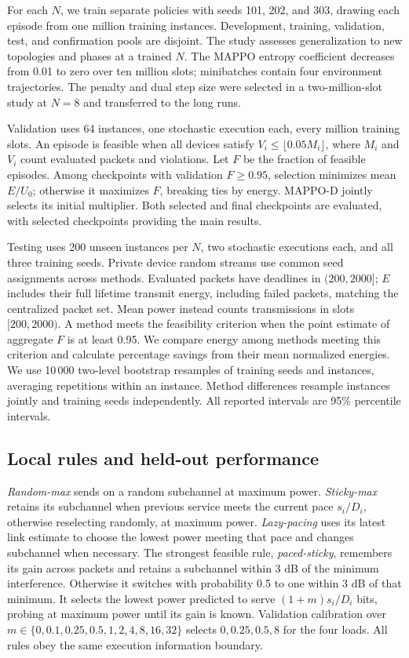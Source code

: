 For each $N$, we train separate policies with seeds 101, 202, and 303,
drawing each episode from one million training instances. Development,
training, validation, test, and confirmation pools are disjoint.
The study assesses generalization to new topologies and phases at a trained
$N$. The MAPPO entropy coefficient decreases from 0.01 to zero over ten
million slots; minibatches contain four environment trajectories.
The penalty and dual step size were selected in a two-million-slot study
at $N=8$ and transferred to the long runs.

Validation uses 64 instances, one stochastic execution each, every million
training slots. An episode is feasible when all devices satisfy
$V_i\le\lfloor0.05M_i\rfloor$, where $M_i$ and $V_i$ count evaluated
packets and violations. Let $F$ be the fraction of feasible episodes.
Among checkpoints with validation $F\ge0.95$, selection minimizes mean
$E/U_0$; otherwise it maximizes $F$, breaking ties by energy.
MAPPO-D jointly selects its initial multiplier. Both selected and final
checkpoints are evaluated, with selected checkpoints providing the main results.

Testing uses 200 unseen instances per $N$, two stochastic executions each,
and all three training seeds. Private device random streams use common seed
assignments across methods. Evaluated packets have deadlines in $(200,2000]$;
$E$ includes their full lifetime transmit energy, including failed packets,
matching the centralized packet set. Mean power instead counts transmissions
in slots $[200,2000)$. A method meets the feasibility criterion when the
point estimate of aggregate $F$ is at least 0.95. We compare energy among
methods meeting this criterion and calculate percentage savings from their
mean normalized energies. We use 10\,000 two-level bootstrap resamples of
training seeds and instances, averaging repetitions within an instance. Method differences
resample instances jointly and training seeds independently. All reported
intervals are 95\% percentile intervals.

\subsection{Local rules and held-out performance}
\emph{Random-max} sends on a random subchannel at maximum power.
\emph{Sticky-max} retains its subchannel when previous service meets the
current pace $s_i/D_i$, otherwise reselecting randomly, at maximum power.
\emph{Lazy-pacing} uses its latest link estimate to choose the lowest power
meeting that pace and changes subchannel when necessary.
The strongest feasible rule, \emph{paced-sticky}, remembers its gain across
packets and retains a subchannel within 3 dB of the minimum interference.
Otherwise it switches with probability 0.5 to one within 3 dB of that minimum.
It selects the lowest power predicted to serve $(1+m)s_i/D_i$ bits,
probing at maximum power until its gain is known. Validation calibration over
$m\in\{0,0.1,0.25,0.5,1,2,4,8,16,32\}$ selects $0,0.25,0.5,8$ for the
four loads. All rules obey the same execution information boundary.

